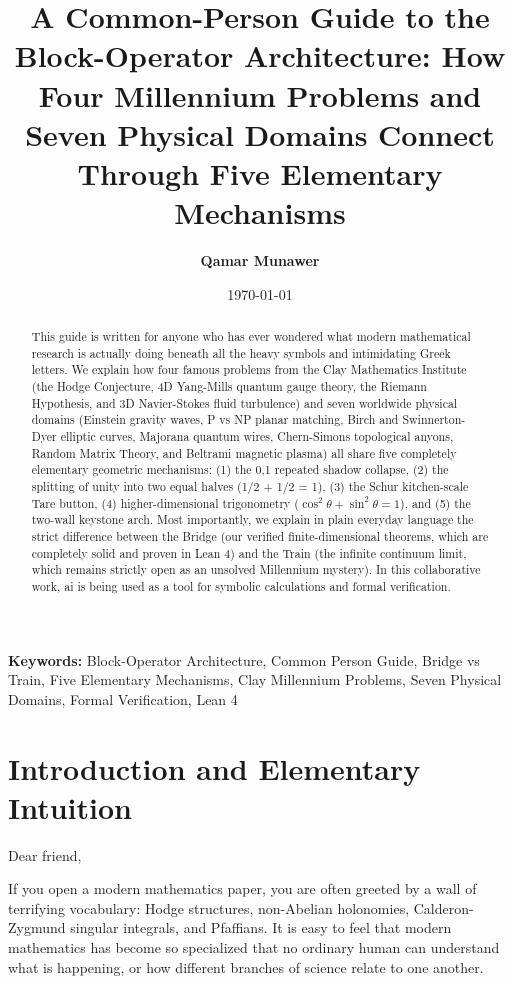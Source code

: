 \documentclass[11pt,a4paper]{article}
\title{\textbf{A Common-Person Guide to the Block-Operator Architecture: How Four Millennium Problems and Seven Physical Domains Connect Through Five Elementary Mechanisms}}
\author{\textbf{Qamar Munawer}}
\date{\today}
\theoremstyle{definition}
\begin{document}
\maketitle

\begin{abstract}
This guide is written for anyone who has ever wondered what modern mathematical research is actually doing beneath all the heavy symbols and intimidating Greek letters. We explain how four famous problems from the Clay Mathematics Institute (the Hodge Conjecture, 4D Yang-Mills quantum gauge theory, the Riemann Hypothesis, and 3D Navier-Stokes fluid turbulence) and seven worldwide physical domains (Einstein gravity waves, P vs NP planar matching, Birch and Swinnerton-Dyer elliptic curves, Majorana quantum wires, Chern-Simons topological anyons, Random Matrix Theory, and Beltrami magnetic plasma) all share five completely elementary geometric mechanisms: (1) the {0,1} repeated shadow collapse, (2) the splitting of unity into two equal halves (1/2 + 1/2 = 1), (3) the Schur kitchen-scale Tare button, (4) higher-dimensional trigonometry ($\cos^2\theta + \sin^2\theta = 1$), and (5) the two-wall keystone arch. Most importantly, we explain in plain everyday language the strict difference between the Bridge (our verified finite-dimensional theorems, which are completely solid and proven in Lean 4) and the Train (the infinite continuum limit, which remains strictly open as an unsolved Millennium mystery). In this collaborative work, ai is being used as a tool for symbolic calculations and formal verification.
\end{abstract}

\vspace{1em}
\noindent\textbf{Keywords:} Block-Operator Architecture, Common Person Guide, Bridge vs Train, Five Elementary Mechanisms, Clay Millennium Problems, Seven Physical Domains, Formal Verification, Lean 4

\section{Introduction and Elementary Intuition}

Dear friend,

If you open a modern mathematics paper, you are often greeted by a wall of terrifying vocabulary: Hodge structures, non-Abelian holonomies, Calderon-Zygmund singular integrals, and Pfaffians. It is easy to feel that modern mathematics has become so specialized that no ordinary human can understand what is happening, or how different branches of science relate to one another.
\end{document}
